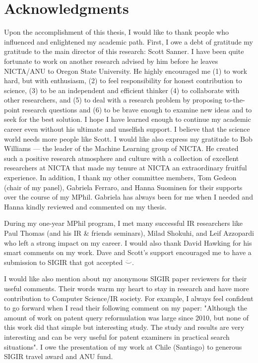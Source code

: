 \chapter*{Acknowledgments}

Upon the accomplishment of this thesis, I would like to thank people who influenced and enlightened my academic path. 
First, I owe a debt of gratitude my gratitude to the main director of this research: Scott Sanner. I have been quite fortunate to work on another research advised by him before he leaves NICTA/ANU to Oregon State University. He highly encouraged me  (1) to work hard, but with enthusiasm, (2) to feel responsibility for honest contribution to science, (3) to be an independent and efficient thinker (4)  to collaborate with other researchers, and (5) to deal with a research problem by proposing to-the-point research questions and (6) to be brave enough to examine new ideas and to seek for the best solution. I hope I have learned enough to continue my academic career even without his ultimate and unselfish support. I believe that the science world needs more people like Scott. I would like also express my gratitude to Bob Williams --- the leader of the Machine Learning group of NICTA. He created such a positive research atmosphere and culture with a collection of excellent researchers at NICTA that made my tenure at NICTA an extraordinary fruitful experience.
In addition, I thank my other committee members, Tom Gedeon (chair of my panel), Gabriela Ferraro, and Hanna Suominen for their supports over the course of my MPhil. Gabriela has always been for me when I needed and Hanna kindly reviewed and commented on my thesis. 

During my one-year MPhil program, I met many successful IR researchers like Paul Thomas (and his IR \& friends seminars), Milad Shokuhi, and Leif Azzopardi who left a strong impact on my career. I would also thank David Hawking for his smart comments on my work. Dave and Scott's support encouraged me to have a submission to SIGIR that got accepted $\ddot\smile$. 

I would like also mention about my anonymous SIGIR paper reviewers for their useful comments. Their words warm my heart to stay in research and have more contribution to Computer Science/IR society. For example, I always feel confident to go forward when I read their following comment on my paper: "Although the amount of work on patent query reformulation was large since 2010, but none of this work did that simple but interesting study. The study and results are very interesting and can be very useful for patent examiners in practical search situations". I owe the presentation of my work at Chile (Santiago) to generous SIGIR travel award and ANU fund. 


